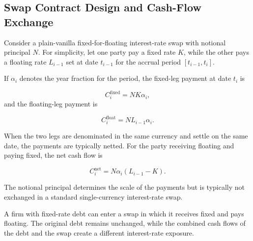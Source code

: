 \subsection{Swap Contract Design and Cash-Flow Exchange}

Consider a plain-vanilla fixed-for-floating interest-rate swap with notional principal $N$. For simplicity, let one party pay a fixed rate $K$, while the other pays a floating rate $L_{i-1}$ set at date $t_{i-1}$ for the accrual period $[t_{i-1},t_i]$.

If $\alpha_i$ denotes the year fraction for the period, the fixed-leg payment at date $t_i$ is

\begin{equation}
C_i^{\text{fixed}}
=
N K \alpha_i,
\label{eq:ch17-fixed-swap-payment}
\end{equation}
and the floating-leg payment is

\begin{equation}
C_i^{\text{float}}
=
N L_{i-1}\alpha_i.
\label{eq:ch17-floating-swap-payment}
\end{equation}

When the two legs are denominated in the same currency and settle on the same date, the payments are typically netted. For the party receiving floating and paying fixed, the net cash flow is

\begin{equation}
C_i^{\text{net}}
=
N\alpha_i(L_{i-1}-K).
\label{eq:ch17-net-interest-swap-payment}
\end{equation}

The notional principal determines the scale of the payments but is typically not exchanged in a standard single-currency interest-rate swap.

\begin{tcolorbox}[
  enhanced,
  breakable,
  colback=white,
  colframe=FinanceBlue,
  boxrule=0.7pt,
  sharp corners,
  borderline west={2.2pt}{0pt}{FinanceBlue},
  title=\textbf{Financial Perspective: Changing Interest-Rate Exposure Without Replacing the Debt},
  coltitle=white,
  colbacktitle=FinanceBlue,
  fonttitle=\bfseries,
  before skip=1.2em,
  after skip=1.2em
]

A firm with fixed-rate debt can enter a swap in which it receives fixed and pays floating. The original debt remains unchanged, while the combined cash flows of the debt and the swap create a different interest-rate exposure.

\end{tcolorbox}


